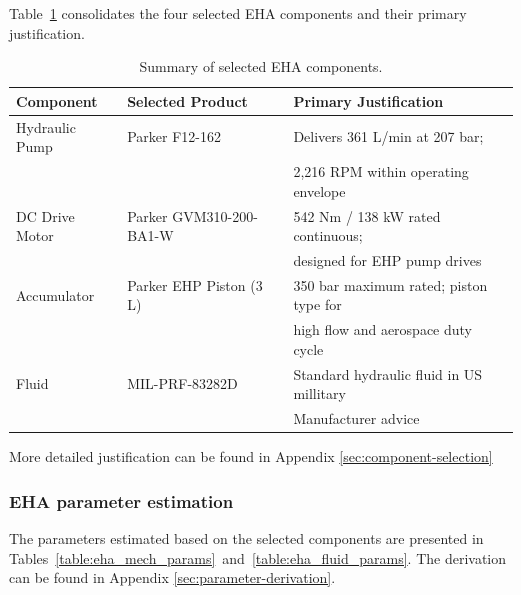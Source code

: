 \documentclass[
bindingoffset=5mm,  %
footnoteindent=3mm, %
hyphenation=true    %
]{src/wut-thesis}
\begin{document}
	Table~\ref{table:component_summary} consolidates the four selected EHA components and their primary justification.
	
	\begin{table}[htbp]
		\centering
		\begin{tabular}{l l l}
			\toprule
			Component & Selected Product & Primary Justification \\
			\midrule
			Hydraulic Pump & Parker F12-162 & Delivers 361 L/min at 207 bar; \\
			&                & 2{,}216 RPM within operating envelope \\
			\addlinespace
			DC Drive Motor & Parker GVM310-200-BA1-W & 542 Nm / 138 kW rated continuous; \\
			&                         & designed for EHP pump drives \\
			\addlinespace
			Accumulator    & Parker EHP Piston (3 L) & 350 bar maximum rated; piston type for \\
			&                          & high flow and aerospace duty cycle \\
			Fluid         &     MIL-PRF-83282D  & Standard hydraulic fluid in US millitary\\ &                           & Manufacturer advice\\
			\bottomrule
		\end{tabular}
		\caption{Summary of selected EHA components.}
		\label{table:component_summary}
	\end{table}
	
	More detailed justification can be found in Appendix \ref{sec:component-selection}
	
	\subsubsection{EHA parameter estimation}
	
	The parameters estimated based on the selected components are presented in Tables~\ref{table:eha_mech_params}~and~\ref{table:eha_fluid_params}. The derivation can be found in Appendix \ref{sec:parameter-derivation}.
	
\end{document}
